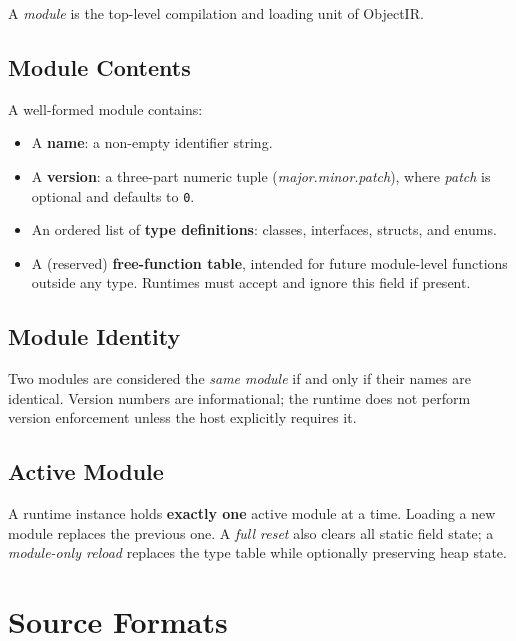 \documentclass[11pt,a4paper]{article}
\begin{document}
A \emph{module} is the top-level compilation and loading unit of ObjectIR.

\subsection{Module Contents}

A well-formed module contains:

\begin{itemize}[leftmargin=1.8em]
  \item A \textbf{name}: a non-empty identifier string.
  \item A \textbf{version}: a three-part numeric tuple
    (\textit{major}.\textit{minor}.\textit{patch}), where \textit{patch} is
    optional and defaults to \texttt{0}.
  \item An ordered list of \textbf{type definitions}: classes, interfaces,
    structs, and enums.
  \item A (reserved) \textbf{free-function table}, intended for future
    module-level functions outside any type. Runtimes must accept and ignore
    this field if present.
\end{itemize}

\subsection{Module Identity}

Two modules are considered the \emph{same module} if and only if their names
are identical. Version numbers are informational; the runtime does not perform
version enforcement unless the host explicitly requires it.

\subsection{Active Module}

A runtime instance holds \textbf{exactly one} active module at a time.
Loading a new module replaces the previous one. A \emph{full reset} also
clears all static field state; a \emph{module-only reload} replaces the type
table while optionally preserving heap state.

\section{Source Formats}
\label{sec:formats}
\end{document}
